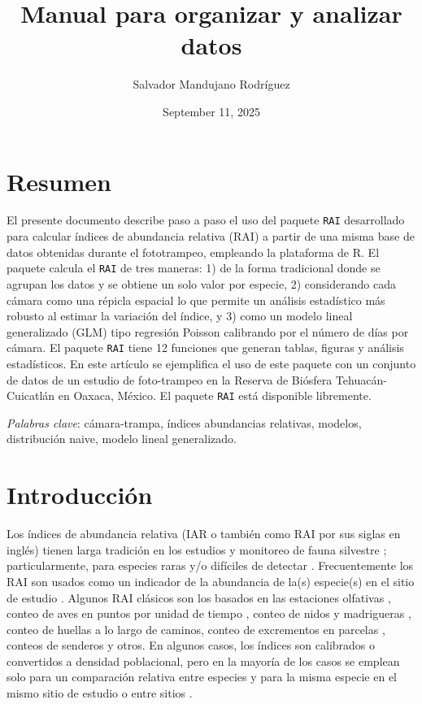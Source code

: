 \documentclass[
  11pt,
]{book}
\title{Manual para organizar y analizar datos}
\author{Salvador Mandujano Rodríguez}
\date{September 11, 2025}
\begin{document}
\maketitle

{
\setcounter{tocdepth}{1}
\tableofcontents
}
\listoffigures
\listoftables
{}
\chapter*{Resumen}\label{resumen}

El presente documento describe paso a paso el uso del paquete \texttt{RAI} desarrollado para calcular índices de abundancia relativa (RAI) a partir de una misma base de datos obtenidas durante el fototrampeo, empleando la plataforma de R. El paquete calcula el \texttt{RAI} de tres maneras: 1) de la forma tradicional donde se agrupan los datos y se obtiene un solo valor por especie, 2) considerando cada cámara como una répicla espacial lo que permite un análisis estadístico más robusto al estimar la variación del índice, y 3) como un modelo lineal generalizado (GLM) tipo regresión Poisson calibrando por el número de días por cámara. El paquete \texttt{RAI} tiene 12 funciones que generan tablas, figuras y análisis estadísticos. En este artículo se ejemplifica el uso de este paquete con un conjunto de datos de un estudio de foto-trampeo en la Reserva de Biósfera Tehuacán-Cuicatlán en Oaxaca, México. El paquete \texttt{RAI} está disponible libremente.

\emph{Palabras clave}: cámara-trampa, índices abundancias relativas, modelos, distribución naive, modelo lineal generalizado.

\pagebreak

\chapter{Introducción}\label{introducciuxf3n}

Los índices de abundancia relativa (IAR o también como RAI por sus siglas en inglés) tienen larga tradición en los estudios y monitoreo de fauna silvestre \citep{Delgado-Martinez2017}; particularmente, para especies raras y/o difíciles de detectar \citep{Raices2017}. Frecuentemente los RAI son usados como un indicador de la abundancia de la(s) especie(s) en el sitio de estudio \citep{effects2009}. Algunos RAI clásicos son los basados en las estaciones olfativas \citep{fegraus2011data}, conteo de aves en puntos por unidad de tiempo \citep{chao2014unifying}, conteo de nidos y madrigueras , conteo de huellas a lo largo de caminos, conteo de excrementos en parcelas \citep[\citet{chao2014unifying}]{chao2012coverage}, conteos de senderos \citep{hill1973diversity} y otros. En algunos casos, los índices son calibrados o convertidos a densidad poblacional, pero en la mayoría de los casos se emplean solo para un comparación relativa entre especies y para la misma especie en el mismo sitio de estudio o entre sitios \citep{hsieh2016inext}.
\end{document}
